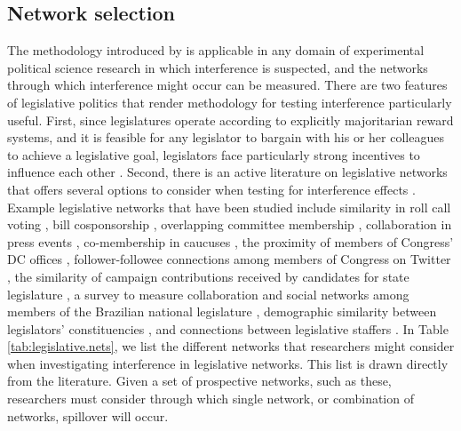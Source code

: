 \documentclass[12pt]{article}
\begin{document}
 \subsection{Network selection}
The methodology introduced by \citet{bowers2012reasoning} is applicable in any domain of experimental political science research in which interference is suspected, and the networks through which interference might occur can be measured.  There are two features of legislative politics that render methodology for testing interference particularly useful. First, since legislatures operate according to explicitly majoritarian reward systems, and it is feasible for any legislator to bargain with his or her colleagues to achieve a legislative goal, legislators face particularly strong incentives to influence each other \citep{matthews1959folkways,ferejohn1986logrolling,bernhard2013commitment}. Second, there is an active literature on legislative networks that offers several options to consider when testing for interference effects \citep{kirkland2014measurement,desmarais2015measuring}. Example legislative networks that have been studied include similarity in roll call voting \citep{kim2012comparing}, bill cosponsorship \citep{fowler2006connecting}, overlapping committee membership \citep{porter2005network}, collaboration in press events \citep{desmarais2015measuring}, co-membership in caucuses \citep{victor2009social}, the proximity of members of Congress' DC offices \citep{rogowski2012estimating}, follower-followee connections among members of Congress on Twitter \citep{peng2016follower}, the similarity of campaign contributions received by candidates for state legislature \citep{masket2015polarization}, a survey to measure collaboration and social networks among members of the Brazilian national legislature \citep{wojcik2017legislative}, demographic similarity between legislators' constituencies \citep{bratton2011networks}, and connections between legislative staffers \citep{ringe2013keeping}.  In Table \ref{tab:legislative.nets}, we list the different networks that researchers might consider when investigating interference in legislative networks. This list is drawn directly from the literature. Given a set of prospective networks, such as these, researchers must consider through which single network, or combination of networks, spillover will occur. 
\end{document}
